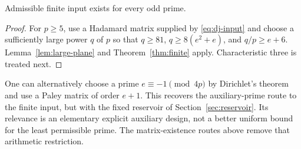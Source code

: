 \begin{corollary}\label{cor:all-odd-input}
Admissible finite input exists for every odd prime.
\end{corollary}
\begin{proof}
For $p\ge5$, use a Hadamard matrix supplied by \eqref{eq:dj-input} and choose a sufficiently large power $q$ of $p$ so that $q\ge81$, $q\ge8(e^2+e)$, and $q/p\ge e+6$. Lemma~\ref{lem:large-plane} and Theorem~\ref{thm:finite} apply. Characteristic three is treated next.
\end{proof}

One can alternatively choose a prime $e\equiv-1\pmod{4p}$ by Dirichlet's theorem \cite{Dir37} and use a Paley matrix of order $e+1$. This recovers the auxiliary-prime route to the finite input, but with the fixed reservoir of Section~\ref{sec:reservoir}. Its relevance is an elementary explicit auxiliary design, not a better uniform bound for the least permissible prime. The matrix-existence routes above remove that arithmetic restriction.
